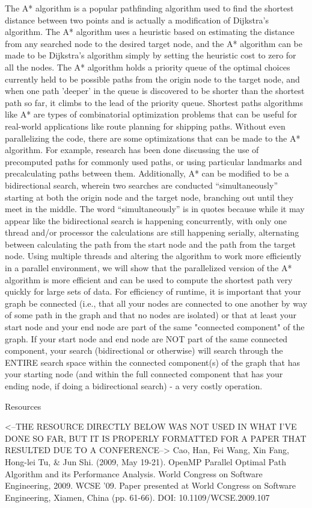 	The A* algorithm is a popular pathfinding algorithm used to find the shortest distance between two points and is actually a modification of Dijkstra's algorithm.  The A* algorithm uses a heuristic based on estimating the distance from any searched node to the desired target node, and the A* algorithm can be made to be Dijkstra's algorithm simply by setting the heuristic cost to zero for all the nodes.  The A* algorithm holds a priority queue of the optimal choices currently held to be possible paths from the origin node to the target node, and when one path 'deeper' in the queue is discovered to be shorter than the shortest path so far, it climbs to the lead of the priority queue.  Shortest paths algorithms like A* are types of combinatorial optimization problems that can be useful for real-world applications like route planning for shipping paths.
	Without even parallelizing the code, there are some optimizations that can be made to the A* algorithm.  For example, research has been done discussing the use of precomputed paths for commonly used paths, or using particular landmarks and precalculating paths between them.  Additionally, A* can be modified to be a bidirectional search, wherein two searches are conducted “simultaneously” starting at both the origin node and the target node, branching out until they meet in the middle.  The word “simultaneously” is in quotes because while it may appear like the bidirectional search is happening concurrently, with only one thread and/or processor the calculations are still happening serially, alternating between calculating the path from the start node and the path from the target node.
	Using multiple threads and altering the algorithm to work more efficiently in a parallel environment, we will show that the parallelized version of the A* algorithm is more efficient and can be used to compute the shortest path very quickly for large sets of data.  For efficiency of runtime, it is important that your graph be connected (i.e., that all your nodes are connected to one another by way of some path in the graph and that no nodes are isolated) or that at least your start node and your end node are part of the same "connected component" of the graph.  If your start node and end node are NOT part of the same connected component, your search (bidirectional or otherwise) will search through the ENTIRE search space within the connected component(s) of the graph that has your starting node (and within the full connected component that has your ending node, if doing a bidirectional search) - a very costly operation.


Resources

<--THE RESOURCE DIRECTLY BELOW WAS NOT USED IN WHAT I'VE DONE SO FAR, BUT IT IS PROPERLY FORMATTED
FOR A PAPER THAT RESULTED DUE TO A CONFERENCE-->
Cao, Han,  Fei Wang, Xin Fang, Hong-lei Tu, & Jun Shi. (2009, May 19-21). OpenMP Parallel Optimal Path Algorithm and its Performance Analysis.  World Congress on Software Engineering, 2009. WCSE '09.  Paper presented at World Congress on Software Engineering,  Xiamen, China (pp. 61-66).
DOI: 10.1109/WCSE.2009.107
